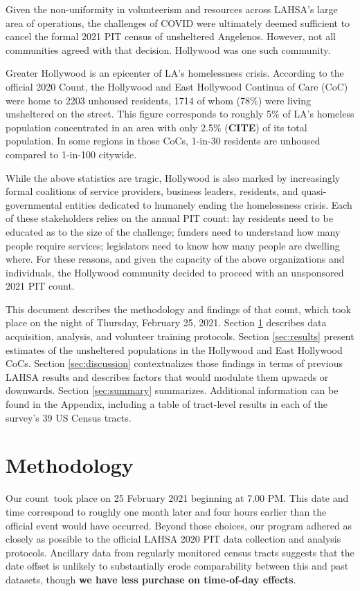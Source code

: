 \documentclass[11pt,twocolumn]{article}
\def\bfr{\bf\color{red}}
\def\Count{count}
\begin{document}
Given the non-uniformity in volunteerism and resources across LAHSA's large area of operations, 
the challenges of COVID were ultimately deemed sufficient to cancel the formal 2021 PIT census of 
unsheltered Angelenos. However, not all communities agreed with that decision. Hollywood was one 
such community.

Greater Hollywood is an epicenter of LA's homelessness crisis. According to the official 2020 
Count, the Hollywood and East Hollywood Continua of Care (CoC) were home to 2203 unhoused residents,
1714 of whom (78\%) were living unsheltered on the street. This figure corresponds to roughly 5\% of LA's 
homeless population concentrated in an area with only 2.5\% ({\bfr CITE}) of its total population. In some 
regions in those CoCs, 1-in-30 residents are unhoused compared to 1-in-100 citywide.

While the above statistics are tragic, Hollywood is also marked by increasingly formal coalitions of 
service providers, business leaders, residents, and quasi-governmental entities dedicated to humanely 
ending the homelessness crisis. Each of these stakeholders relies on the annual PIT count: lay residents need
to be educated as to the size of the challenge; funders need to understand how many people require services;
legislators need to know how many people are dwelling where. For these reasons, and given the 
capacity of the above organizations and individuals, the Hollywood community decided to proceed with 
an unsponsored 2021 PIT \Count.

This document describes the methodology and findings of that \Count, which took place on the night of 
Thursday, February 25, 2021. Section \ref{sec:procedure} describes data acquisition, analysis, and volunteer
training protocols. Section \ref{sec:results} present estimates of the unsheltered 
populations in the Hollywood and East Hollywood CoCs. Section \ref{sec:discussion}
contextualizes those findings in terms of previous LAHSA results and describes factors that would
modulate them upwards or downwards. Section \ref{sec:summary} summarizes. Additional information
can be found in the Appendix, including a table of tract-level results in each of the survey's 39 US 
Census tracts.

\section{Methodology}
\label{sec:procedure}

Our \Count\ took place on 25 February 2021 beginning at 7.00 PM. This date and time correspond to 
roughly one month later and four hours earlier than the official event would have occurred. Beyond
those choices, our program adhered as closely as possible to the official LAHSA 2020 PIT data 
collection and analysis protocols. Ancillary data from regularly monitored census tracts suggests 
that the date offset is unlikely to substantially erode comparability between this and past datasets, 
though {\bfr we have less purchase on time-of-day effects}.
\end{document}
